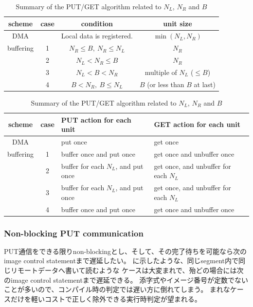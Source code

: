 \begin{table}[tbh]
 \caption{Summary of the PUT/GET algorithm related to $N_L$, $N_R$ and $B$}
 \label{tab:putget}
 \begin{flushleft}
  \begin{tabular}{|@{~}c@{~}|c||@{~}c@{~}|@{~}c@{~}|}
\hline
scheme &
case &
condition &
unit size \\
\hline
\hline
DMA &
&
Local data is registered. &
$\min(N_L, N_R)$ \\
\hline
buffering &
1 & 
$N_R \leq B,~ N_R \leq N_L$ &
$N_R$ \\
\cline{2-4}
&
2 &
$N_L < N_R \leq B$ &
$N_R$ \\
\cline{2-4}
&
3 &
$N_L < B < N_R$ &
multiple of $N_L$ ($\leq B$) \\
\cline{2-4}
&
4 &
$B < N_R,~ B \leq N_L$ &
$B$ (or less than $B$ at last) \\
\hline
  \end{tabular}
 \end{flushleft}
 \begin{flushleft}
  \begin{tabular}{|@{~}c@{~}|c||@{~~}l@{~~}|@{~~}l@{~~}|}
\hline
scheme &
case &
PUT action for each unit &
GET action for each unit \\
\hline
\hline
DMA &
&
put once &
get once \\
\hline
buffering &
1 &
buffer once and put once &
get once and unbuffer once \\
\cline{2-4}
&
2 &
buffer for each $N_L$, and put once &
get once, and unbuffer for each $N_L$ \\
\cline{2-4}
&
3 &
buffer for each $N_L$, and put once &
get once, and unbuffer for each $N_L$ \\
\cline{2-4}
&
4 &
buffer once and put once &
get once and unbuffer once \\
\hline
  \end{tabular}
 \end{flushleft}
\end{table}


\subsubsection{Non-blocking PUT communication}

PUT通信をできる限りnon-blockingとし、そして、その完了待ちを可能なら次のimage control statementまで遅延したい。
に示したような、同じsegment内で同じリモートデータへ書いて読むような
ケースは大変まれで、殆どの場合には次のimage control statementまで遅延できる。
添字式やイメージ番号が定数でないことが多いので、コンパイル時の判定では遅い方に倒れてしまう。
まれなケースだけを軽いコストで正しく除外できる実行時判定が望まれる。

